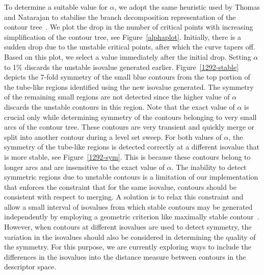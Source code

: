 \documentclass[review,journal]{vgtc}         %
\begin{document}
To determine a suitable value for $\alpha$, we adopt the same heuristic used by Thomas and Natarajan
to stabilise the branch decomposition representation of the contour tree~\cite{ThomN11}. We plot
the drop in the number of critical points with increasing simplification of the contour tree,
see Figure~\ref{alphaplot}. Initially, there is a sudden drop due to the unstable critical points, 
after which the curve tapers off. Based on this plot, we select a value immediately after the initial drop.
Setting $\alpha$ to 1\% discards the unstable isovalue generated earlier. 
Figure~\ref{1292-stable} depicts the 7-fold symmetry of the small blue contours from the top portion of
the tube-like regions identified using the new isovalue generated. The symmetry of the remaining small regions
are not detected since the higher value of $\alpha$ discards the unstable contours in this region. 
Note that the exact value of $\alpha$ is crucial only while determining symmetry of the contours belonging to 
very small arcs of the contour tree. These contours are very transient and quickly merge or split
into another contour during a level set sweep. For both values of $\alpha$, the symmetry of
the tube-like regions is detected correctly at a different isovalue that is more stable, 
see Figure~\ref{1292-sym}. This is because these contours belong to longer arcs and are 
insensitive to the exact value of $\alpha$. {\color{blue}The inability to detect symmetric
regions due to unstable contours is a limitation of our implementation that enforces the constraint
that for the same isovalue, contours should be consistent with respect to merging. A solution is
to relax this constraint and allow a small interval of isovalues from which stable contours 
may be generated independently by employing a geometric criterion like maximally stable contour~\cite{MatasCUP04}.
However, when contours at different isovalues are used to detect symmetry, the variation in the isovalues
should also be considered in determining the quality of the symmetry. For this purpose, we are currently
exploring ways to include the differences in the isovalues into the distance measure between contours
in the descriptor space.}
\end{document}
